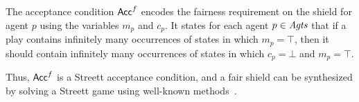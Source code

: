 The acceptance condition $\mathsf{Acc}^{f}$ encodes the fairness requirement on the shield for agent $p$ using the variables $m_p$ and $c_p$. It states  for each agent $p\in \mathit{Agts}$ that if a play contains infinitely many occurrences of states in which $m_p = \top$, then it should contain infinitely many occurrences of states in which  $c_p  = \bot$ and $m_p=\top$. 

Thus, $\mathsf{Acc}^{f}$ is a Streett acceptance condition, and a fair shield can be synthesized by solving a 
Streett game using well-known methods~\cite{PitermanP06}.

